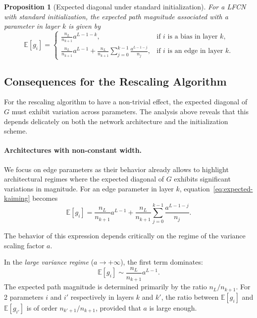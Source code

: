 \documentclass{article}
\theoremstyle{plain}
\newtheorem{proposition}[theorem]{Proposition}
\theoremstyle{definition}
\theoremstyle{remark}
\begin{document}
\begin{proposition}[Expected diagonal under standard initialization]
\label{prop:expected-standard-init}
For a LFCN with standard initialization, the expected path magnitude associated with a parameter in layer $k$ is given by
\begin{equation}
\label{eq:expected-kaiming}
\mathbb{E}[g_i] =
\begin{cases}
\displaystyle
\frac{n_L}{n_{k+1}} a^{L-1-k},
& \text{if $i$ is a bias in layer $k$,}\\[10pt]
\displaystyle
\frac{n_L}{n_{k+1}} a^{L-1} + \frac{n_L}{n_{k+1}} \sum_{j=0}^{k-1} \frac{a^{L-1-j}}{n_j},
& \text{if $i$ is an edge in layer $k$.}
\end{cases}
\end{equation}
\end{proposition}


\subsection{Consequences for the Rescaling Algorithm}
\label{sec:nonconstantwidth}

For the rescaling algorithm to have a non-trivial effect, the expected diagonal of $G$ must exhibit variation across parameters. The analysis above reveals that this depends delicately on both the network architecture and the initialization scheme.

\paragraph{Architectures with non-constant width.}
We focus on edge parameters as their behavior already allows to highlight architectural regimes where the expected diagonal of $G$ exhibits significant variations in magnitude.
For an edge parameter in layer $k$, equation~\eqref{eq:expected-kaiming} becomes
\[
\mathbb{E}[g_i] = \frac{n_L}{n_{k+1}} a^{L-1} + \frac{n_L}{n_{k+1}} \sum_{j=0}^{k-1} \frac{a^{L-1-j}}{n_j}.
\]

The behavior of this expression depends critically on the regime of the variance scaling factor $a$.

In the \emph{large variance regime} ($a \to +\infty$), the first term dominates:
\[
\mathbb{E}[g_i] \sim \frac{n_L}{n_{k+1}} a^{L-1}.
\]
The expected path magnitude is determined primarily by the ratio $n_L/n_{k+1}$.
For 2 parameters $i$ and $i'$ respectively in layers $k$ and $k'$, the ratio between $\mathbb{E}[g_i]$ and $\mathbb{E}[g_{i'}]$  is of order $n_{k'+1}/n_{k+1}$, provided that $a$ is large enough.
\end{document}
